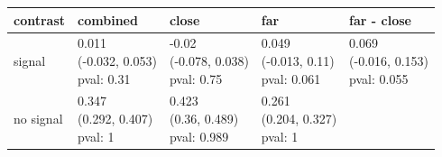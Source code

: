 


\centering
\begin{tabular}[t]{l|l|l|l|l}
\hline
contrast & combined & close & far & far - close\\
\hline
signal & \makecell[c]{0.011\\(-0.032, 0.053)\\pval: 0.31} & \makecell[c]{-0.02\\(-0.078, 0.038)\\pval: 0.75} & \makecell[c]{0.049\\(-0.013, 0.11)\\pval: 0.061} & \makecell[c]{0.069\\(-0.016, 0.153)\\pval: 0.055}\\
\hline
no signal & \makecell[c]{0.347\\(0.292, 0.407)\\pval: 1} & \makecell[c]{0.423\\(0.36, 0.489)\\pval: 0.989} & \makecell[c]{0.261\\(0.204, 0.327)\\pval: 1} & \\
\hline
\end{tabular}

